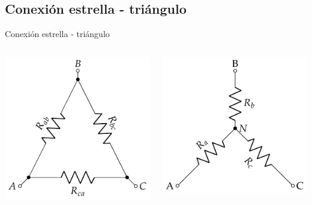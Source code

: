 \documentclass[aspectratio=169, xcolor={usenames,svgnames,dvipsnames}]{beamer}
\begin{document}
\subsection{Conexión estrella - triángulo}

\begin{frame}{Conexión estrella - triángulo}
\begin{columns}
\begin{column}{0.5\columnwidth}
\begin{center}
\includegraphics[width=.9\linewidth]{../figs/Conexion_Triangulo.pdf}
\end{center}
\end{column}
\begin{column}{0.5\columnwidth}
\begin{center}
\includegraphics[width=.9\linewidth]{../figs/Conexion_Estrella.pdf}
\end{center}
\end{column}
\end{columns}
\end{frame}
\end{document}
